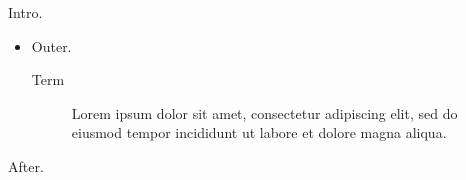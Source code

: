 \documentclass[10pt]{article}
\begin{document}
Intro.
\begin{itemize}
\item Outer.
\begin{description}
\item[Term] Lorem ipsum dolor sit amet, consectetur adipiscing elit, sed do eiusmod tempor incididunt ut labore et dolore magna aliqua.
\end{description}
\end{itemize}
After.
\end{document}

